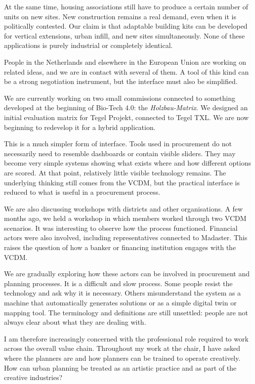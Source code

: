 At the same time, housing associations still have to produce a certain number of units on new sites. New construction remains a real demand, even when it is politically contested. Our claim is that adaptable building kits can be developed for vertical extensions, urban infill, and new sites simultaneously. None of these applications is purely industrial or completely identical.

People in the Netherlands and elsewhere in the European Union are working on related ideas, and we are in contact with several of them. A tool of this kind can be a strong negotiation instrument, but the interface must also be simplified.

We are currently working on two small commissions connected to something developed at the beginning of Bio-Tech 4.0: the \textit{Holzbau-Matrix}. We designed an initial evaluation matrix for Tegel Projekt, connected to Tegel TXL. We are now beginning to redevelop it for a hybrid application.

This is a much simpler form of interface. Tools used in procurement do not necessarily need to resemble dashboards or contain visible sliders. They may become very simple systems showing what exists where and how different options are scored. At that point, relatively little visible technology remains. The underlying thinking still comes from the VCDM, but the practical interface is reduced to what is useful in a procurement process.

We are also discussing workshops with districts and other organisations. A few months ago, we held a workshop in which members worked through two VCDM scenarios. It was interesting to observe how the process functioned. Financial actors were also involved, including representatives connected to Madaster. This raises the question of how a banker or financing institution engages with the VCDM.

We are gradually exploring how these actors can be involved in procurement and planning processes. It is a difficult and slow process. Some people resist the technology and ask why it is necessary. Others misunderstand the system as a machine that automatically generates solutions or as a simple digital twin or mapping tool. The terminology and definitions are still unsettled: people are not always clear about what they are dealing with.

I am therefore increasingly concerned with the professional role required to work across the overall value chain. Throughout my work at the chair, I have asked where the planners are and how planners can be trained to operate creatively. How can urban planning be treated as an artistic practice and as part of the creative industries?


